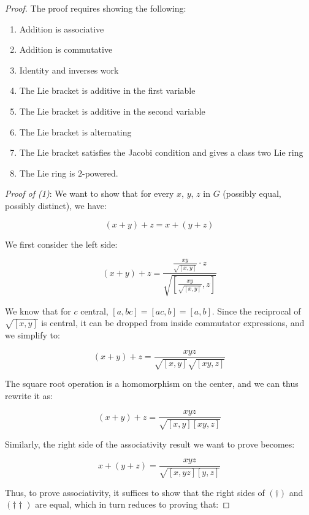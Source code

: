 \documentclass{ucetd}
\begin{document}
\begin{proof}
  The proof requires showing the following:

  \begin{enumerate}
  \item Addition is associative
  \item Addition is commutative
  \item Identity and inverses work
  \item The Lie bracket is additive in the first variable
  \item The Lie bracket is additive in the second variable
  \item The Lie bracket is alternating
  \item The Lie bracket satisfies the Jacobi condition and gives a class two Lie ring
  \item The Lie ring is $2$-powered.
  \end{enumerate}
  
  {\em Proof of (1)}: We want to show that for every $x$, $y$, $z$ in
  $G$ (possibly equal, possibly distinct), we have:

  $$(x + y) + z = x + (y + z)$$

  We first consider the left side:

  $$(x + y) + z = \frac{\frac{xy}{\sqrt{[x,y]}} \cdot z}{\sqrt{\left[\frac{xy}{\sqrt{[x,y]}},z\right]}}$$

  We know that for $c$ central, $[a,bc] = [ac,b] = [a,b]$. Since the
  reciprocal of $\sqrt{[x,y]}$ is central, it can be dropped from
  inside commutator expressions, and we simplify to:

  $$(x + y) + z = \frac{xyz}{\sqrt{[x,y]}\sqrt{[xy,z]}}$$

  The square root operation is a homomorphism on the center, and we can thus rewrite it as:

  \begin{equation*}
    (x + y) + z = \frac{xyz}{\sqrt{[x,y][xy,z]}} \tag{$\dagger$}
  \end{equation*}

  Similarly, the right side of the associativity result we want to prove becomes:

  \begin{equation*}
    x + (y + z) = \frac{xyz}{\sqrt{[x,yz][y,z]}} \tag{$\dagger \dagger$} 
  \end{equation*}

  Thus, to prove associativity, it suffices to show that the right
  sides of $(\dagger)$ and $(\dagger\dagger)$ are equal, which in turn
  reduces to proving that:


\end{proof}
\end{document}
